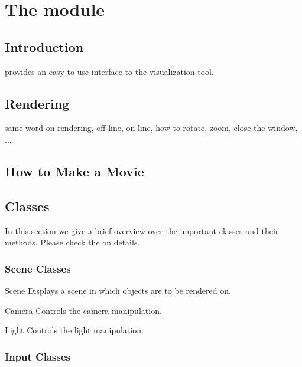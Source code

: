 \chapter{The module \pyvisi}
\label{PYVISI CHAP}

\section{Introduction}

\pyvisi provides an easy to use interface to the \VTK visualization 
tool.  

\section{Rendering}
same word on rendering, off-line, on-line, how to rotate, zoom, close the window, ...

\section{How to Make a Movie}

\section{\pyvisi Classes}

In this section we give a brief overview over the important classes and their methods. Please
check the \ReferenceGuide on details.
\subsection{Scene Classes}
\begin{classdesc}{Scene}{}
Displays a scene in which objects are to be rendered on.
\end{classdesc}

\begin{classdesc}{Camera}{}
 Controls the camera manipulation. 
\end{classdesc}

\begin{classdesc}{Light}{}
 Controls the light manipulation.
\end{classdesc}

\subsection{Input Classes}

